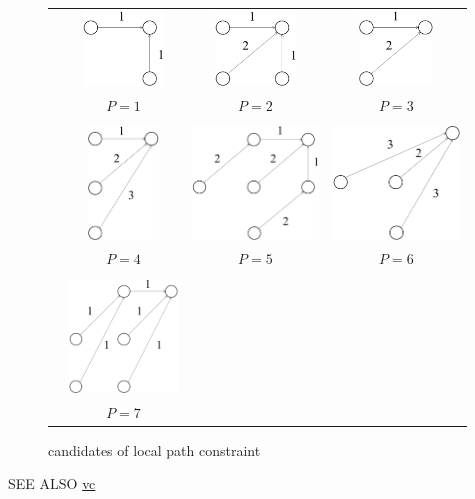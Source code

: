 \begin{figure}[htbp]
 \begin{center}
  \begin{tabular}{cccc} \\[-1ex]
   &\includegraphics[height=2cm]{fig/path1.pdf}
   &\includegraphics[height=2cm]{fig/path2.pdf}
   &\includegraphics[height=2cm]{fig/path3.pdf}\\
   &$P=1$&$P=2$&$P=3$\\
   &&&\\
   &\includegraphics[height=3cm]{fig/path4.pdf}
       &\includegraphics[height=3cm]{fig/path5.pdf}
   &\includegraphics[height=3cm]{fig/path6.pdf}\\
   &$P=4$&$P=5$&$P=6$\\
   &&&\\
   &\includegraphics[height=3cm]{fig/path7.pdf}
       &&\\
   &$P=7$&&\\
  \end{tabular}
 \end{center}
 \caption{candidates of local path constraint}
 \label{fig:dtw_cand}
\end{figure}

\begin{qsection}{SEE ALSO}
\hyperlink{vc}{vc}
\end{qsection}
